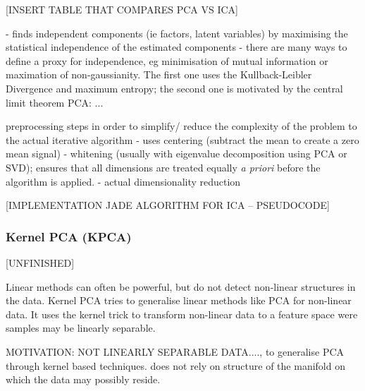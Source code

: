 \documentclass[journal, a4paper]{IEEEtran}
\begin{document}

[INSERT TABLE THAT COMPARES PCA VS ICA] 



- finds independent components (ie factors, latent variables) by maximising the statistical independence of the estimated components
- there are many ways to define a proxy for independence, eg minimisation of mutual information or maximation of non-gaussianity. The first one uses the Kullback-Leibler Divergence and maximum entropy; the second one is motivated by the central limit theorem %
PCA:
...

preprocessing steps in order to simplify/ reduce the complexity of the problem to the actual iterative algorithm
- uses centering (subtract the mean to create a zero mean signal)
- whitening (usually with eigenvalue decomposition using PCA or SVD); ensures that all dimensions are treated equally \textit{a priori} before the algorithm is applied. 
- actual dimensionality reduction 

[IMPLEMENTATION JADE ALGORITHM FOR ICA -- PSEUDOCODE]



\hfill
\subsubsection{Kernel PCA (KPCA)}
[UNFINISHED]

Linear methods can often be powerful, but do not detect non-linear structures in the data.
Kernel PCA tries to generalise linear methods like PCA for non-linear data.
It uses the kernel trick to transform non-linear data to a feature space were samples may be linearly separable.

MOTIVATION: NOT LINEARLY SEPARABLE DATA...., to generalise PCA through kernel based techniques. does not rely on structure of the manifold on which the data may possibly reside. 
\end{document}
